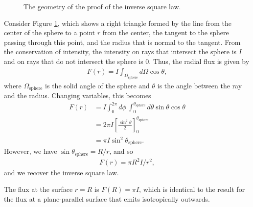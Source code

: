 \newslide

\begin{problem}

\begin{figure}[bp]
\centering
{}
\caption{The geometry of the proof of the inverse square law.}
\label{fig-inverse-square-law}
\end{figure}

Consider Figure \ref{fig-inverse-square-law}, which shows a right
triangle formed by the line from the center of the sphere to a point $r$
from the center, the tangent to the sphere passing through this point,
and the radius that is normal to the tangent. From the conservation of
intensity, the intensity on rays that intersect the sphere is $I$ and on
rays that do not intersect the sphere is 0. Thus, the radial flux is
given by
\begin{align}
F(r) = I \int_{\Omega_\mathrm{sphere}}\!\!\!\!\!\!d\Omega
\cos\theta,
\end{align}
where $\Omega_\mathrm{sphere}$ is the solid angle of the
sphere and $\theta$ is the angle between the ray and the
radius. Changing variables, this becomes
\begin{align}
F(r) &= I
\int_0^{2\pi}\!\!\!d\phi\:
\int_0^{\theta_\mathrm{sphere}}\!\!\!d\theta \sin\theta
\cos\theta\\
&=
2\pi I \left[\frac{\sin^2\theta}{2}\right]_0^{\theta_\mathrm{sphere}}\\
&=
\pi I \sin^2\theta_\mathrm{sphere}.
\end{align}
However, we have $\sin\theta_\mathrm{sphere} = R / r$, and so
\begin{align}
F(r) = \pi R^2 I / r^2,
\end{align}
and we recover the inverse square law.

The flux at the surface $r = R$ is $F(R) = \pi I$, which is
identical to the result for the flux at a plane-parallel
surface that emits isotropically outwards.

\end{problem}

\newslide


